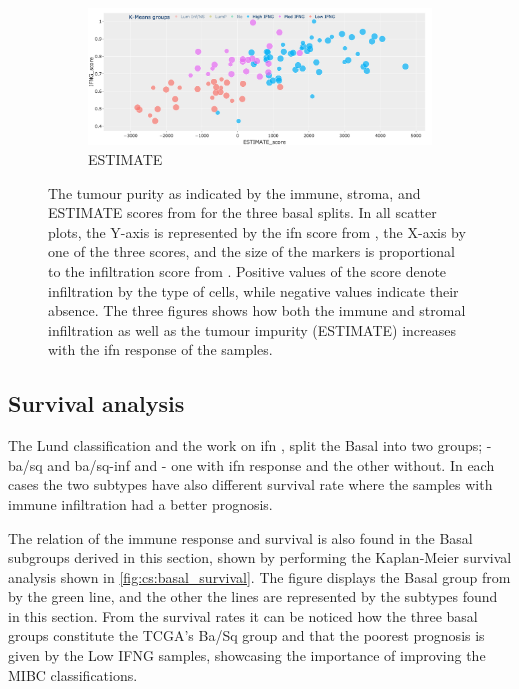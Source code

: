 \begin{figure}[H]
    \centering
    \begin{subfigure}[!t]{0.89\textwidth}
        \includegraphics[width=\textwidth,keepaspectratio]{Sections/ClusteringAnalysis/Resources/discussion/Estimate_spectrum.png}
        \caption{ESTIMATE}
        \label{fig:cs:estimate_basal}
    \end{subfigure}
    \centering
    \caption{The tumour purity as indicated by the immune, stroma, and ESTIMATE scores from \citet{Yoshihara2013-wq} for the three basal splits. In all scatter plots, the Y-axis is represented by the \acrshort{ifn} score from \citet{Baker2022-bj}, the X-axis by one of the three scores, and the size of the markers is proportional to the infiltration score from \citet{Robertson2017-mg}. Positive values of the score denote infiltration by the type of cells, while negative values indicate their absence. The three figures shows how both the immune and stromal infiltration as well as the tumour impurity (ESTIMATE) increases with the \acrshort{ifn} response of the samples.}
    \label{fig:cs:tumour_purity}
\end{figure}


\subsection{Survival analysis}

The Lund classification \citet{Marzouka2018-ge} and the work on \acrshort{ifn} \citet{Baker2022-bj}, split the Basal into two groups; \citet{Marzouka2018-ge} - \acrfull{ba/sq} and \acrfull{ba/sq-inf} and \citet{Baker2022-bj} - one with \acrshort{ifn} response and the other without. In each cases the two subtypes have also different survival rate where the samples with immune infiltration had a better prognosis.

The relation of the immune response and survival is also found in the Basal subgroups derived in this section, shown by performing the Kaplan-Meier survival analysis shown in \cref{fig:cs:basal_survival}. The figure displays the Basal group from \citet{Robertson2017-mg} by the green line, and the other the lines are represented by the subtypes found in this section. From the survival rates it can be noticed how the three basal groups constitute the TCGA's Ba/Sq group and that the poorest prognosis is given by the Low IFNG samples, showcasing the importance of improving the MIBC classifications. 


